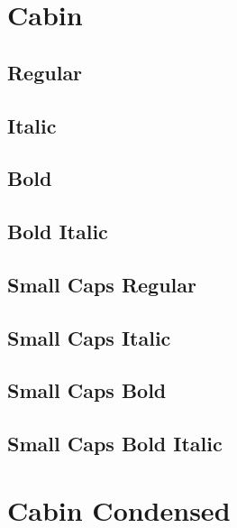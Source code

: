 \documentclass{article}
\begin{document}
\section*{Cabin}
\subsection*{Regular}
\lipsum[1]  

\subsection*{Italic}
\textit{\lipsum[2]}

\subsection*{Bold}

\textbf{\lipsum[3]}



\subsection*{Bold Italic}

\textbf{\textit{\lipsum[4]}}



\subsection*{Small Caps Regular}
\textsc{\lipsum[5]}


\subsection*{Small Caps Italic}
\textsc{\textit{\lipsum[6]}}

\subsection*{Small Caps Bold}
\textsc{\textbf{\lipsum[7]}}

\subsection*{Small Caps Bold Italic}

\textsc{\textbf{\textit{\lipsum[8]}}}


\section*{Cabin Condensed}
\end{document}
